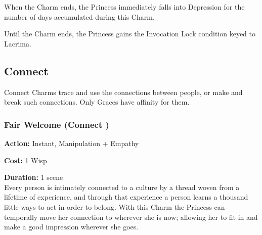 When the Charm ends, the Princess immediately falls into Depression for the number of days accumulated during this Charm. 
    
Until the Charm ends, the Princess gains the Invocation Lock condition keyed to Lacrima.

\subsection*{Connect}
\label{subsec:Connect}
Connect Charms trace and use the connections between people, or make and break such connections. Only Graces have affinity for them.

\subsubsection*{Fair Welcome (Connect \textbullet)}

\noindent \textbf{Action:} Instant, Manipulation + Empathy
	
\noindent \textbf{Cost:} 1 Wisp

\noindent \textbf{Duration:} 1 scene \\

Every person is intimately connected to a culture by a thread woven from a lifetime of experience, and through that experience a person learns a thousand little ways to act in order to belong. With this Charm the Princess can temporally move her connection to wherever she is now; allowing her to fit in and make a good impression wherever she goes. 

